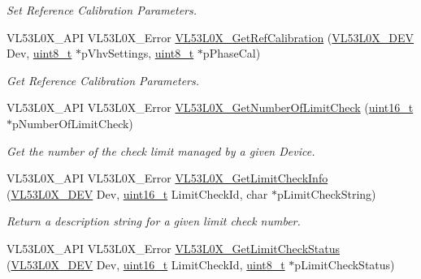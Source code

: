 \begin{DoxyCompactItemize}
\begin{DoxyCompactList}\small\item\em Set Reference Calibration Parameters. \end{DoxyCompactList}\item 
V\+L53\+L0\+X\+\_\+\+A\+PI V\+L53\+L0\+X\+\_\+\+Error \hyperlink{group__VL53L0X__parameters__group_ga5dc1b02f59fb47477184354975f169b6}{V\+L53\+L0\+X\+\_\+\+Get\+Ref\+Calibration} (\hyperlink{group__VL53L0X__platform__group_ga2d6405308b1dd524b462f1b8fb97d167}{V\+L53\+L0\+X\+\_\+\+D\+EV} Dev, \hyperlink{vl53l0x__types_8h_aba7bc1797add20fe3efdf37ced1182c5}{uint8\+\_\+t} $\ast$p\+Vhv\+Settings, \hyperlink{vl53l0x__types_8h_aba7bc1797add20fe3efdf37ced1182c5}{uint8\+\_\+t} $\ast$p\+Phase\+Cal)
\begin{DoxyCompactList}\small\item\em Get Reference Calibration Parameters. \end{DoxyCompactList}\item 
V\+L53\+L0\+X\+\_\+\+A\+PI V\+L53\+L0\+X\+\_\+\+Error \hyperlink{group__VL53L0X__parameters__group_ga96302da749e35322c0f031037aa457e1}{V\+L53\+L0\+X\+\_\+\+Get\+Number\+Of\+Limit\+Check} (\hyperlink{vl53l0x__types_8h_a273cf69d639a59973b6019625df33e30}{uint16\+\_\+t} $\ast$p\+Number\+Of\+Limit\+Check)
\begin{DoxyCompactList}\small\item\em Get the number of the check limit managed by a given Device. \end{DoxyCompactList}\item 
V\+L53\+L0\+X\+\_\+\+A\+PI V\+L53\+L0\+X\+\_\+\+Error \hyperlink{group__VL53L0X__parameters__group_ga4155c6a50a3eaf215d686759022a68f8}{V\+L53\+L0\+X\+\_\+\+Get\+Limit\+Check\+Info} (\hyperlink{group__VL53L0X__platform__group_ga2d6405308b1dd524b462f1b8fb97d167}{V\+L53\+L0\+X\+\_\+\+D\+EV} Dev, \hyperlink{vl53l0x__types_8h_a273cf69d639a59973b6019625df33e30}{uint16\+\_\+t} Limit\+Check\+Id, char $\ast$p\+Limit\+Check\+String)
\begin{DoxyCompactList}\small\item\em Return a description string for a given limit check number. \end{DoxyCompactList}\item 
V\+L53\+L0\+X\+\_\+\+A\+PI V\+L53\+L0\+X\+\_\+\+Error \hyperlink{group__VL53L0X__parameters__group_gab2edaef078d47dc9cac152d0e23493e9}{V\+L53\+L0\+X\+\_\+\+Get\+Limit\+Check\+Status} (\hyperlink{group__VL53L0X__platform__group_ga2d6405308b1dd524b462f1b8fb97d167}{V\+L53\+L0\+X\+\_\+\+D\+EV} Dev, \hyperlink{vl53l0x__types_8h_a273cf69d639a59973b6019625df33e30}{uint16\+\_\+t} Limit\+Check\+Id, \hyperlink{vl53l0x__types_8h_aba7bc1797add20fe3efdf37ced1182c5}{uint8\+\_\+t} $\ast$p\+Limit\+Check\+Status)

\end{DoxyCompactItemize}
